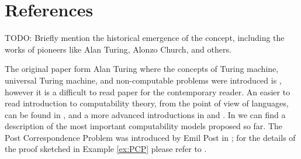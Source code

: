 %
%

\section*{References}

{\color{red} TODO:  Briefly mention the historical emergence of the concept, including the works of pioneers like Alan Turing, Alonzo Church, and others.}

The original paper form Alan Turing where the concepts of Turing machine, universal Turing machine, and non-computable problems were introduced is \cite{turing1936computable}, however it is a difficult to read paper for the contemporary reader. An easier to read introduction to computability theory, from the point of view of languages, can be found in \cite{sipser2012introduction}, and a more advanced introductions in \cite{cooper2003computability} and \cite{soare2016turing}. In \cite{fernandez2009models} we can find a description of the most important computability models proposed so far. The Post Correspondence Problem was introduced by Emil Post in \cite{post1946variant}; for the details of the proof sketched in Example \ref{ex:PCP} please refer to \cite{sipser2012introduction}.

